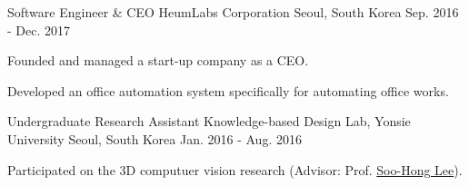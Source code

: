 \begin{cventries}
\cventry
{Software Engineer \& CEO} %
{HeumLabs Corporation} %
{Seoul, South Korea} %
{Sep. 2016 - Dec. 2017} %
{ %
\begin{cvitems}
\item {Founded and managed a start-up company as a CEO.}
\item {Developed an office automation system specifically for automating office works.}
\end{cvitems}
}
\vspace{-.5em}

\cventry
{Undergraduate Research Assistant} %
{Knowledge-based Design Lab, Yonsie University} %
{Seoul, South Korea} %
{Jan. 2016 - Aug. 2016} %
{ %
\begin{cvitems}
\item {Participated on the 3D computuer vision research (Advisor: Prof. \href{https://kbd.yonsei.ac.kr}{Soo-Hong Lee}).}
\end{cvitems}
}
\vspace{-.5em}



\end{cventries}
